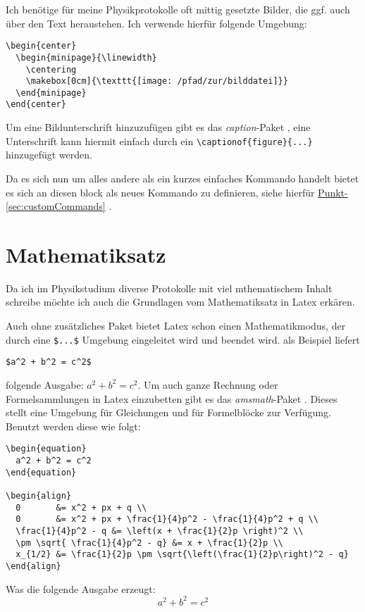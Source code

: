 \documentclass[a4paper, parskip=half]{scrartcl}
\newcommand{\mySecRef}[1]{%
  \hyperref[sec:#1]{Punkt-}\ref{sec:#1}%
}
\newcommand{\myPackage}[1]{%
  \textit{#1}-Paket%
}
\begin{document}
Ich benötige für meine Physikprotokolle oft mittig gesetzte Bilder, die ggf. auch über den Text heraustehen.
Ich verwende hierfür folgende Umgebung:
\begin{verbatim}
\begin{center}
  \begin{minipage}{\linewidth}
    \centering
    \makebox[0cm]{\texttt{[image: /pfad/zur/bilddatei]}}
  \end{minipage}
\end{center}
\end{verbatim}

Um eine Bildunterschrift hinzuzufügen gibt es das \myPackage{caption}, eine Unterschrift kann hiermit einfach
durch ein \verb+\captionof{figure}{...}+ hinzugefügt werden.

Da es sich nun um alles andere als ein kurzes einfaches Kommando handelt bietet es sich an diesen block als neues
Kommando zu definieren, siehe hierfür \mySecRef{customCommands}.

\section{Mathematiksatz}
Da ich im Physikstudium diverse Protokolle mit viel mthematischem Inhalt schreibe möchte ich auch die
Grundlagen vom Mathematiksatz in Latex erkären.

Auch ohne zusätzliches Paket bietet Latex schon einen Mathematikmodus, der durch eine \verb+$...$+
Umgebung eingeleitet wird und beendet wird. als Beispiel liefert
\begin{verbatim}
$a^2 + b^2 = c^2$
\end{verbatim}
folgende Ausgabe:
$a^2 + b^2 = c^2$. Um auch ganze Rechnung oder Formelsammlungen in Latex einzubetten gibt es das
\myPackage{amsmath}. Dieses stellt eine Umgebung für Gleichungen und für Formelblöcke zur Verfügung.
Benutzt werden diese wie folgt:
\begin{verbatim}
\begin{equation}
  a^2 + b^2 = c^2
\end{equation}

\begin{align}
  0       &= x^2 + px + q \\
  0       &= x^2 + px + \frac{1}{4}p^2 - \frac{1}{4}p^2 + q \\
  \frac{1}{4}p^2 - q &= \left(x + \frac{1}{2}p \right)^2 \\
  \pm \sqrt{ \frac{1}{4}p^2 - q} &= x + \frac{1}{2}p \\
  x_{1/2} &= \frac{1}{2}p \pm \sqrt{\left(\frac{1}{2}p\right)^2 - q}  
\end{align}
\end{verbatim}
Was die folgende Ausgabe erzeugt:
\begin{equation}
  a^2 + b^2 = c^2
\end{equation}
\end{document}
